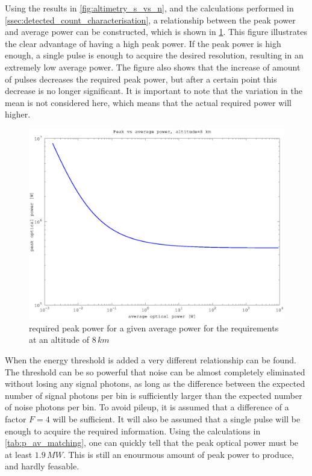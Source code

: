 Using the results in \cref{fig:altimetry_s_vs_n}, and the calculations performed in \cref{ssec:detected_count_characterisation}, a relationship between the peak power and average power can be constructed, which is shown in \cref{fig:peak_vs_av}. This figure illustrates the clear advantage of having a high peak power. If the peak power is high enough, a single pulse is enough to acquire the desired resolution, resulting in an extremely low average power. The figure also shows that the increase of amount of pulses decreases the required peak power, but after a certain point this decrease is no longer significant. It is important to note that the variation in the mean is not considered here, which means that the actual required power will higher.

\begin{figure}[h]
\centering
	\includegraphics[width=0.8\linewidth]{fig/peak_vs_av.eps}
\caption{required peak power for a given average power for the requirements at an altitude of $8\,km$}
\label{fig:peak_vs_av}
\end{figure}

When the energy threshold is added a very different relationship can be found. The threshold can be so powerful that noise can be almost completely eliminated without losing any signal photons, as long as the difference between the expected number of signal photons per bin is sufficiently larger than the expected number of noise photons per bin. To avoid pileup, it is assumed that a difference of a factor $F=4$ will be sufficient. It will also be assumed that a single pulse will be enough to acquire the required information. Using the calculations in \cref{tab:p_av_matching}, one can quickly tell that the peak optical power must be at least $1.9\,MW$. This is still an enourmous amount of peak power to produce, and hardly feasable.

